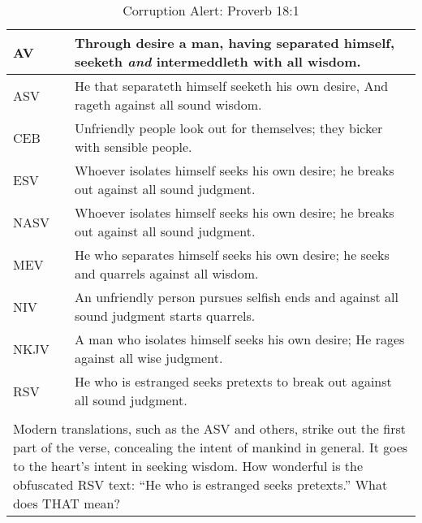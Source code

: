 \newpage
\begin{center}

\begin{table}[ht]
\centering
\begin{tabular}{|p{.5in}|p{3.5in}|}
\hline

\textcolor[rgb]{0.00,0.00,1.00}{AV} & \textcolor[rgb]{0.00,0.00,1.00}{Through desire a man, having separated himself, seeketh \emph{and} intermeddleth with all wisdom.} \\ \hline \hline

ASV &  He that separateth himself seeketh his own desire, And rageth against all sound wisdom. \\ \hline
%
CEB &   Unfriendly people look out for themselves; they bicker with sensible people.\\ \hline
%
ESV & Whoever isolates himself seeks his own desire;  he breaks out against all sound judgment. \\ \hline
%
NASV &  Whoever isolates himself seeks his own desire;  he breaks out against all sound judgment.\\ \hline
%
MEV & He who separates himself seeks his own desire; he seeks and quarrels against all wisdom.\\ \hline
%
NIV &  An unfriendly person pursues selfish ends and against all sound judgment starts quarrels. \\ \hline
%
NKJV &   A man who isolates himself seeks his own desire; He rages against all wise judgment.\\ \hline
%
RSV &  He who is estranged seeks pretexts  to break out against all sound judgment.\\ \hline \hline
\\ \hline \hline

\multicolumn{2}{|p{4.2in}|}{{\textcolor{jungle}{Modern translations, such as the ASV and others, strike out the first part of the verse, concealing the intent of mankind in general.  It goes to the heart's intent in seeking wisdom. How wonderful is the obfuscated RSV text: ``He who is estranged seeks pretexts.'' What does THAT mean?}}} \\ \hline

\end{tabular}
\caption[Corruption Alert: Proverb 18:1]{Corruption Alert: Proverb 18:1} \label{table:Corruption Proverb 18-1}
\end{table}

\end{center}
